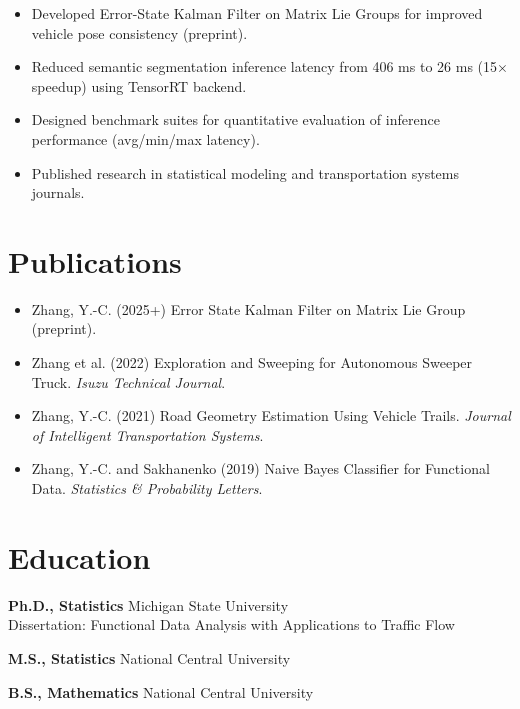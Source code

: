 \documentclass[11pt]{article}
\begin{document}
\begin{itemize}[leftmargin=*]
\item Developed Error-State Kalman Filter on Matrix Lie Groups for improved vehicle pose consistency (preprint).
\item Reduced semantic segmentation inference latency from 406 ms to 26 ms (15$\times$ speedup) using TensorRT backend.
\item Designed benchmark suites for quantitative evaluation of inference performance (avg/min/max latency).
\item Published research in statistical modeling and transportation systems journals.
\end{itemize}

\section*{Publications}

\begin{itemize}[leftmargin=*]
\item Zhang, Y.-C. (2025+) Error State Kalman Filter on Matrix Lie Group (preprint).
\item Zhang et al. (2022) Exploration and Sweeping for Autonomous Sweeper Truck. \textit{Isuzu Technical Journal}.
\item Zhang, Y.-C. (2021) Road Geometry Estimation Using Vehicle Trails. \textit{Journal of Intelligent Transportation Systems}.
\item Zhang, Y.-C. and Sakhanenko (2019) Naive Bayes Classifier for Functional Data. \textit{Statistics \& Probability Letters}.
\end{itemize}

\section*{Education}

\textbf{Ph.D., Statistics} \hfill Michigan State University \\
Dissertation: Functional Data Analysis with Applications to Traffic Flow

\textbf{M.S., Statistics} \hfill National Central University

\textbf{B.S., Mathematics} \hfill National Central University
\end{document}
